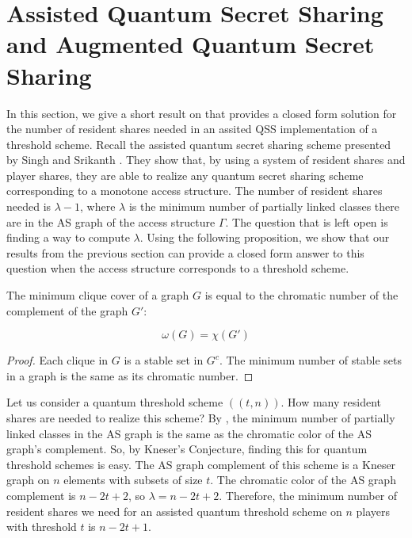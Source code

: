 

\section{Assisted Quantum Secret Sharing and Augmented Quantum Secret Sharing}
\label{sec:aqss-and-aqss}

In this section, we give a short result on that provides a closed form solution for the number of resident shares needed in an assited QSS implementation of a threshold scheme. Recall the assisted quantum secret sharing scheme presented by Singh and Srikanth \cite{singh_assisted_2004}. They show that, by using a system of resident shares and player shares, they are able to realize any quantum secret sharing scheme corresponding to a monotone access structure. The number of resident shares needed is $\lambda-1$, where $\lambda$ is the minimum number of partially linked classes there are in the AS graph of the access structure $\Gamma$. The question that is left open is finding a way to compute $\lambda$. Using the following proposition, we show that our results from the previous section can provide a closed form answer to this question when the access structure corresponds to a threshold scheme.

\begin{proposition}
    \label{prop:chrom-clique}
    The minimum clique cover of a graph $G$ is equal to the chromatic number of the complement of the graph $G'$:
    
    \[\omega(G) = \chi(G')\]
\end{proposition}

\begin{proof}
    Each clique in $G$ is a stable set in $G^c$. The minimum number of stable sets in a graph is the same as its chromatic number.
\end{proof}

Let us consider a quantum threshold scheme $((t,n))$. How many resident shares are needed to realize this scheme? By , the minimum number of partially linked classes in the AS graph is the same as the chromatic color of the AS graph's complement. So, by Kneser's Conjecture, finding this for quantum threshold schemes is easy. The AS graph complement of this scheme is a Kneser graph on $n$ elements with subsets of size $t$. The chromatic color of the AS graph complement is $n-2t+2$, so $\lambda = n-2t+2$. Therefore, the minimum number of resident shares we need for an assisted quantum threshold scheme on $n$ players with threshold $t$ is $n-2t+1$.



